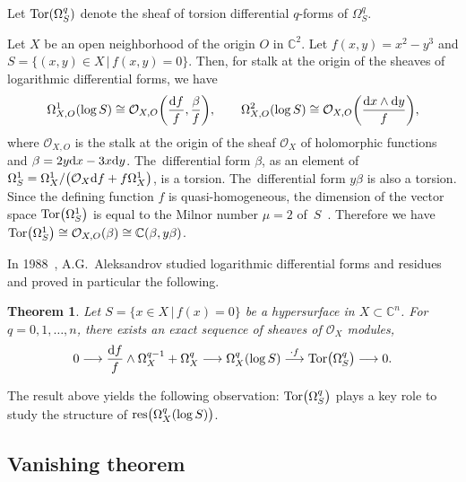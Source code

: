 \documentclass[pdftex]{sigma}%
\numberwithin{equation}{section}
\newtheorem{Theorem}{Theorem}[section]
\begin{document}
Let $ {\rm Tor}(\Omega_S^{q}) $ denote the sheaf of torsion differential $q$-forms of $ \Omega_S^{q}$.

\begin{Example}\label{Ex1}
Let $ X $ be an open neighborhood of the origin $O$ in $ \mathbb{C}^2.$ Let $ f(x,y)=x^2-y^3$ and $ S=\{ (x,y) \in X \,|\, f(x,y)=0 \}$. Then, for stalk at the origin of the sheaves of logarithmic differential forms, we have
\begin{gather*}
\Omega_{X,O}^{1}(\log S) \cong {\mathcal O}_{X,O}\bigg(\frac{{\rm d}f}{f}, \frac{\beta}{f}\bigg), \qquad \Omega_{X,O}^{2}(\log S) \cong {\mathcal O}_{X,O}\bigg(\frac{{\rm d}x\wedge {\rm d}y}{f}\bigg),
\end{gather*}
where ${\mathcal O}_{X,O}$ is the stalk at the origin of the sheaf ${\mathcal O}_X$ of holomorphic functions and $\beta=2y {\rm d}x-3x{\rm d}y$. The~dif\-ferential form $\beta$, as an element of $\Omega_S^{1} = \Omega_X^{1}/\big(\mathcal{O}_{X}{\rm d}f +f\Omega_X^{1}\big)$, is a torsion. The~dif\-ferential form $y\beta$ is also a torsion. Since the defining function $f$ is quasi-homogeneous, the dimension of the vector space ${\rm Tor}\big(\Omega_S^{1}\big)$ is equal to the Milnor number $\mu=2$ of~$S$~\cite{M, Z}. Therefore we have
$ {\rm Tor}\big(\Omega_S^{1}\big) \cong {\mathcal O}_{X,O}(\beta) \cong {\mathbb C}(\beta, y\beta)$.
\end{Example}

In 1988~\cite{A88}, A.G.~Aleksandrov studied logarithmic differential forms and residues and proved in particular the following.

\begin{Theorem}
Let $S=\{ x \in X \,|\, f(x) =0 \} $ be a hypersurface in $X \subset {\mathbb C}^n$. For $ q=0,1,\ldots,n $, there exists an exact sequence of sheaves of $ {\mathcal O}_{X} $ modules,
\begin{gather*}
0 \longrightarrow\frac{{\rm d}f}{f} \wedge \Omega_{X}^{q-1}+ \Omega_{X}^{q} \longrightarrow
\Omega_{X}^{q}(\log S) \stackrel{\cdot f}\longrightarrow {\rm Tor}\big(\Omega_{S}^{q}\big) \longrightarrow 0.
\end{gather*}
\end{Theorem}

The result above yields the following observation:
$ {\rm Tor}\big(\Omega_{S}^{q}\big)$ plays a key role to study the structure of $ {\rm res}\big(\Omega_X^{q}(\log S)\big)$.

\subsection{Vanishing theorem}
\end{document}
